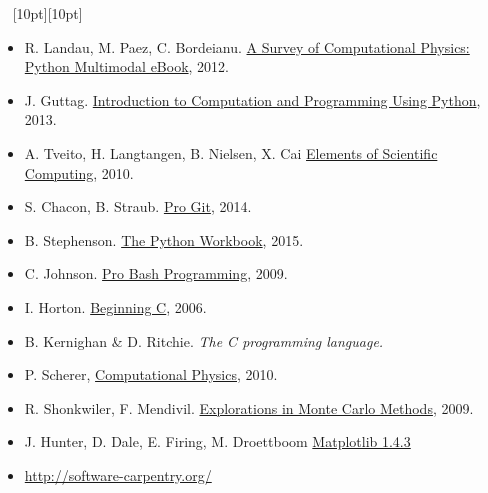 \documentclass[letterpaper,10pt,onecolumn]{article}
\begin{document}
\vspace{0.2cm}
\noindent \hrulefill~ \raisebox{-1pt}[10pt][10pt]{\leafleft}~ \hrulefill
\small
\begin{itemize}
\item  R. Landau, M. Paez, C. Bordeianu. \href{http://www.compadre.org/psrc/items/detail.cfm?ID=11578}{A Survey of Computational Physics: Python Multimodal eBook}, 2012.
\item  J. Guttag. \href{http://mitpress.mit.edu/books/introduction-computation-and-programming-using-python-0}{Introduction to Computation and Programming Using Python}, 2013.
\item  A. Tveito, H. Langtangen, B. Nielsen, X. Cai  \href{http://link.springer.com.ezproxy.uniandes.edu.co:8080/book/10.1007\%2F978-3-642-11299-7}{Elements of Scientific Computing}, 2010.
\item S. Chacon, B. Straub. \href{http://link.springer.com.ezproxy.uniandes.edu.co:8080/book/10.1007\%2F978-1-4302-1834-0}{Pro Git}, 2014.
\item B. Stephenson. \href{http://link.springer.com.ezproxy.uniandes.edu.co:8080/book/10.1007\%2F978-3-319-14240-1}{The Python Workbook}, 2015.
\item C. Johnson. \href{http://link.springer.com.ezproxy.uniandes.edu.co:8080/book/10.1007\%2F978-1-4302-1998-9}{Pro Bash Programming}, 2009.
\item I. Horton. \href{http://link.springer.com.ezproxy.uniandes.edu.co:8080/book/10.1007\%2F978-1-4302-0243-1}{Beginning C}, 2006.
\item B. Kernighan \& D. Ritchie. \textit{The C programming language.}
\item P. Scherer, \href{http://link.springer.com.ezproxy.uniandes.edu.co:8080/book/10.1007\%2F978-3-642-13990-1}{Computational Physics}, 2010.
\item R. Shonkwiler, F. Mendivil.  \href{http://link.springer.com.ezproxy.uniandes.edu.co:8080/book/10.1007\%2F978-0-387-87837-9}{Explorations in Monte Carlo Methods}, 2009.
\item J. Hunter, D. Dale, E. Firing, M. Droettboom \href{http://matplotlib.org/Matplotlib.pdf}{Matplotlib 1.4.3}
\item\url{http://software-carpentry.org/}
\end{itemize}

\end{document}
